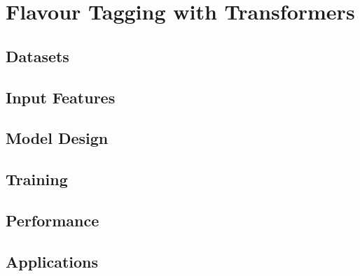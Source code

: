 \chapter{Flavour Tagging with Transformers}

\section{Datasets}

\section{Input Features}

\section{Model Design}

\section{Training}

\section{Performance}

\section{Applications}










